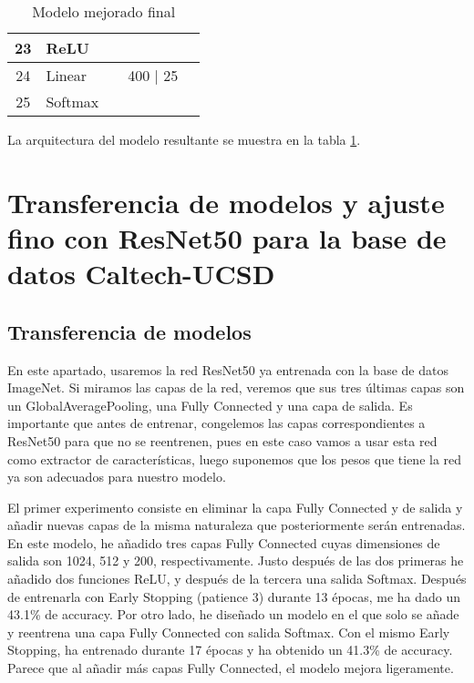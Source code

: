 \documentclass[10pt,a4paper]{article}
\begin{document}
\begin{table}[]
\begin{tabular}{|c|l|c|c|c|}
23                 & ReLU                                     &                                                                &                                                                             &                                                                            \\ \hline
24                 & Linear                                   &                                                                & 400 | 25                                                                    &                                                                            \\ \hline
25                 & Softmax                                  &                                                                &                                                                             &                                                                            \\ \hline
\end{tabular}
\caption{Modelo mejorado final}
\label{tabla_modelo_mejorado_final}
\end{table}

La arquitectura del modelo resultante se muestra en la tabla \ref{tabla_modelo_mejorado_final}.




\newpage

\section{Transferencia de modelos y ajuste fino con ResNet50 para la base de datos Caltech-UCSD}

\subsection{Transferencia de modelos}

En este apartado, usaremos la red ResNet50 ya entrenada con la base de datos ImageNet. Si miramos las capas de la red, veremos que sus tres últimas capas son un GlobalAveragePooling, una Fully Connected y una capa de salida. Es importante que antes de entrenar, congelemos las capas correspondientes a ResNet50 para que no se reentrenen, pues en este caso vamos a usar esta red como extractor de características, luego suponemos que los pesos que tiene la red ya son adecuados para nuestro modelo.

El primer experimento consiste en eliminar la capa Fully Connected y de salida y añadir nuevas capas de la misma naturaleza que posteriormente serán entrenadas. En este modelo, he añadido tres capas Fully Connected cuyas dimensiones de salida son 1024, 512 y 200, respectivamente. Justo después de las dos primeras he añadido dos funciones ReLU, y después de la tercera una salida Softmax. Después de entrenarla con Early Stopping (patience 3) durante 13 épocas, me ha dado un 43.1\% de accuracy. Por otro lado, he diseñado un modelo en el que solo se añade y reentrena una capa Fully Connected con salida Softmax. Con el mismo Early Stopping, ha entrenado durante 17 épocas y ha obtenido un 41.3\% de accuracy. Parece que al añadir más capas Fully Connected, el modelo mejora ligeramente.
\end{document}
